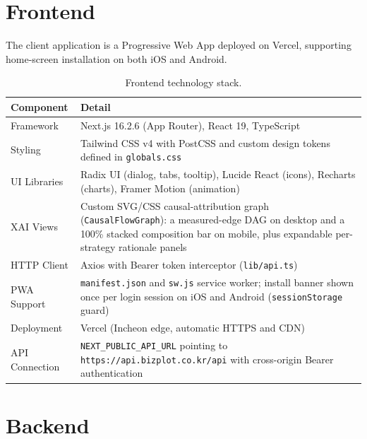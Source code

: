 \documentclass[11pt, a4paper]{article}
\begin{document}
\section{Frontend}

The client application is a Progressive Web App deployed on Vercel,
supporting home-screen installation on both iOS and Android.

\begin{table}[H]
\centering
\caption{Frontend technology stack.}
\label{tab:frontend}
\renewcommand{\arraystretch}{1.35}
\begin{tabularx}{\textwidth}{M{3.0cm} L}
\toprule
\textbf{Component}  & \textbf{Detail} \\
\midrule
Framework       & Next.js 16.2.6 (App Router), React 19, TypeScript \\
Styling         & Tailwind CSS v4 with PostCSS and custom design tokens
                  defined in \texttt{globals.css} \\
UI Libraries    & Radix UI (dialog, tabs, tooltip), Lucide React (icons),
                  Recharts (charts), Framer Motion (animation) \\
XAI Views       & Custom SVG/CSS causal-attribution graph
                  (\texttt{CausalFlowGraph}): a measured-edge DAG on desktop
                  and a 100\% stacked composition bar on mobile, plus
                  expandable per-strategy rationale panels \\
HTTP Client     & Axios with Bearer token interceptor
                  (\texttt{lib/api.ts}) \\
PWA Support     & \texttt{manifest.json} and \texttt{sw.js} service worker;
                  install banner shown once per login session on iOS and
                  Android (\texttt{sessionStorage} guard) \\
Deployment      & Vercel (Incheon edge, automatic HTTPS and CDN) \\
API Connection  & \texttt{NEXT\_PUBLIC\_API\_URL} pointing to
                  \texttt{https://api.bizplot.co.kr/api} with cross-origin
                  Bearer authentication \\
\bottomrule
\end{tabularx}
\end{table}


\section{Backend}
\end{document}
